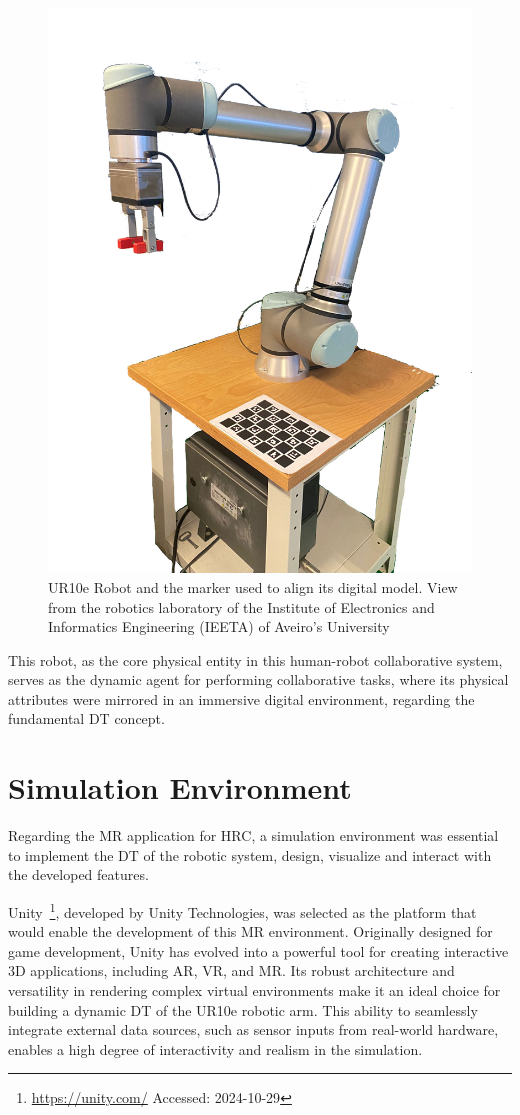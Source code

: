 \begin{figure}[h]
    \centering
    \includegraphics[width=0.35\linewidth]{figs/robot-marker.png}
    \caption{UR10e Robot and the marker used to align its digital model. View from the robotics laboratory of the Institute of Electronics and Informatics Engineering (IEETA) of Aveiro's University}
    \label{f:ur10e_iris}
\end{figure}


This robot, as the core physical entity in this human-robot collaborative system, serves as the dynamic agent for performing collaborative tasks, where its physical attributes were mirrored in an immersive digital environment, regarding the fundamental \ac{DT} concept.

\section{Simulation Environment}

Regarding the \ac{MR} application for \ac{HRC}, a simulation environment was essential to implement the \ac{DT} of the robotic system, design, 
visualize and interact with the developed features.

Unity~\footnote{\url{https://unity.com/} Accessed: 2024-10-29}, developed by Unity Technologies, was selected as the platform that would enable the development of this \ac{MR} environment. Originally designed for game development, Unity has evolved into a powerful tool for creating interactive 3D applications, including \ac{AR}, \ac{VR}, and \ac{MR}. Its robust architecture and versatility in rendering complex virtual environments make it an ideal choice for building a dynamic \ac{DT} of the UR10e robotic arm. This ability to seamlessly integrate external data sources, such as sensor inputs from real-world hardware, enables a high degree of interactivity and realism in the simulation.

